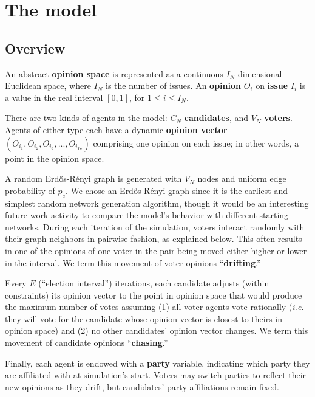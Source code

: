 \section{The model}
\label{sec:model}

\subsection{Overview}

An abstract \textbf{opinion space} is represented as a continuous
$I_N$-dimensional Euclidean space, where $I_N$ is the number of issues. An
\textbf{opinion} $O_i$ on \textbf{issue} $I_i$ is a value in the real interval
$[0,1]$, for $1 \leq i \leq I_N$.

There are two kinds of agents in the model: $C_N$ \textbf{candidates}, and
$V_N$ \textbf{voters}. Agents of either type each have a dynamic
\textbf{opinion vector} $(O_{i_1}, O_{i_2}, O_{i_3}, ..., O_{i_{I_N}})$
comprising one opinion on each issue; in other words, a point in the opinion
space.

A random Erd\H{o}s-R\'{e}nyi graph\cite{erdos_evolution_1960} is generated
with $V_N$ nodes and uniform edge probability of $p_e$. We chose an Erd\H{o}s-R\'{e}nyi 
graph since it is the earliest and simplest random network generation algorithm, though it
would be an interesting future work activity to compare the model's behavior with
different starting networks. During each iteration
of the simulation, voters interact randomly with their graph neighbors in
pairwise fashion, as explained below. This often results in one of the opinions
of one voter in the pair being moved either higher or lower in the interval.
We term this movement of voter opinions ``\textbf{drifting}.''

Every $E$ (``election interval'') iterations, each candidate adjusts (within
constraints) its opinion vector to the point in opinion space that would
produce the maximum number of votes assuming (1) all voter agents vote
rationally (\textit{i.e.} they will vote for the candidate whose opinion vector
is closest to theirs in opinion space) and (2) no other candidates' opinion
vector changes. We term this movement of candidate opinions
``\textbf{chasing}.''

Finally, each agent is endowed with a \textbf{party} variable, indicating which
party they are affiliated with at simulation's start. Voters may switch parties 
to reflect their new opinions as they drift, but candidates' party affiliations
remain fixed.

